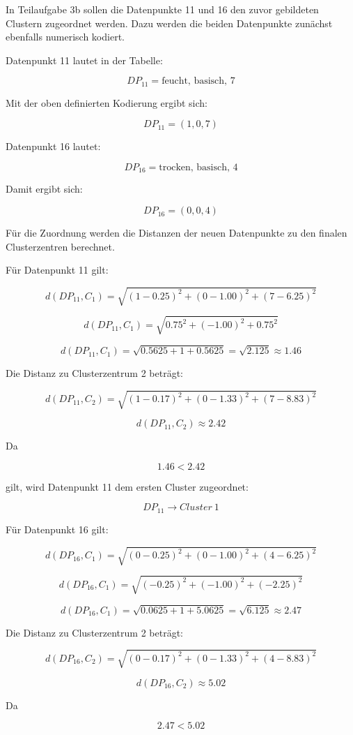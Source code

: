 \documentclass[12pt,a4paper]{article}
\begin{document}
In Teilaufgabe 3b sollen die Datenpunkte 11 und 16 den zuvor gebildeten Clustern zugeordnet werden. Dazu werden die beiden Datenpunkte zunächst ebenfalls numerisch kodiert.

Datenpunkt 11 lautet in der Tabelle:

\[
DP_{11} = \text{feucht, basisch, 7}
\]

Mit der oben definierten Kodierung ergibt sich:

\[
DP_{11} = (1,0,7)
\]

Datenpunkt 16 lautet:

\[
DP_{16} = \text{trocken, basisch, 4}
\]

Damit ergibt sich:

\[
DP_{16} = (0,0,4)
\]

Für die Zuordnung werden die Distanzen der neuen Datenpunkte zu den finalen Clusterzentren berechnet.

Für Datenpunkt 11 gilt:

\[
d(DP_{11}, C_1)
=
\sqrt{(1-0.25)^2 + (0-1.00)^2 + (7-6.25)^2}
\]

\[
d(DP_{11}, C_1)
=
\sqrt{0.75^2 + (-1.00)^2 + 0.75^2}
\]

\[
d(DP_{11}, C_1)
=
\sqrt{0.5625 + 1 + 0.5625}
=
\sqrt{2.125}
\approx 1.46
\]

Die Distanz zu Clusterzentrum 2 beträgt:

\[
d(DP_{11}, C_2)
=
\sqrt{(1-0.17)^2 + (0-1.33)^2 + (7-8.83)^2}
\]

\[
d(DP_{11}, C_2)
\approx 2.42
\]

Da

\[
1.46 < 2.42
\]

gilt, wird Datenpunkt 11 dem ersten Cluster zugeordnet:

\[
DP_{11} \rightarrow Cluster\ 1
\]

Für Datenpunkt 16 gilt:

\[
d(DP_{16}, C_1)
=
\sqrt{(0-0.25)^2 + (0-1.00)^2 + (4-6.25)^2}
\]

\[
d(DP_{16}, C_1)
=
\sqrt{(-0.25)^2 + (-1.00)^2 + (-2.25)^2}
\]

\[
d(DP_{16}, C_1)
=
\sqrt{0.0625 + 1 + 5.0625}
=
\sqrt{6.125}
\approx 2.47
\]

Die Distanz zu Clusterzentrum 2 beträgt:

\[
d(DP_{16}, C_2)
=
\sqrt{(0-0.17)^2 + (0-1.33)^2 + (4-8.83)^2}
\]

\[
d(DP_{16}, C_2)
\approx 5.02
\]

Da

\[
2.47 < 5.02
\]
\end{document}
